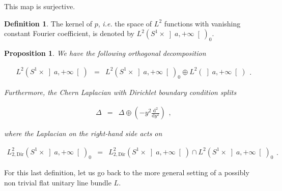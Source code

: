 \documentclass{jams-l}
\newtheorem{proposition}[theorem]{Proposition}
\theoremstyle{definition}
\newtheorem{definition}[theorem]{Definition}
\theoremstyle{remark}
\numberwithin{equation}{section}
\begin{document}
        \noindent This map is surjective.
        
        \begin{definition}
        
            The kernel of $p$, \textit{i.e.} the space of $L^2$ functions with vanishing constant Fourier coefficient, is denoted by $L^2 \left( S^1 \times \left] a, +\infty \right[ \right)_0$.
        
        \end{definition}
        
        \begin{proposition}
        
            We have the following orthogonal decomposition
            
            \[ \begin{array}{lll}
                    L^2 \left( S^1 \times \left] a, +\infty \right[ \right) & = & L^2 \left( S^1 \times \left] a, +\infty \right[ \right)_0 \oplus L^2 \left( \left] a, +\infty \right[ \right)
                \end{array} . \]
            
            \noindent Furthermore, the Chern Laplacian with Dirichlet boundary condition splits
            
            \[ \begin{array}{lll}
                    \Delta & = & \Delta \oplus \left( - y^2 \frac{\mathrm{d}^2}{\mathrm{d}y^2} \right)
                \end{array} , \]
            
            \noindent where the Laplacian on the right-hand side acts on
            
            \[ \begin{array}{lll}
                    L^2_{2, \mathrm{Dir}} \left( S^1 \times \left] a, +\infty \right[ \right)_0 & = & L^2_{2, \mathrm{Dir}} \left( S^1 \times \left] a, +\infty \right[ \right) \cap L^2 \left( S^1 \times \left] a, +\infty \right[ \right)_0
                \end{array} . \]
        
        \end{proposition}
        
        For this last definition, let us go back to the more general setting of a possibly non trivial flat unitary line bundle $L$.
        
\end{document}
